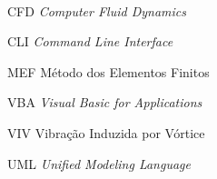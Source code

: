 

\imprimirfolhaderosto\

% 

% 









\listoffigures*
\cleardoublepage

\listoftables*
\cleardoublepage

\begin{siglas}
  \item[CFD] \textit{Computer Fluid Dynamics}
  \item[CLI] \textit{Command Line Interface}
  \item[MEF] Método dos Elementos Finitos
  \item[VBA] \textit{Visual Basic for Applications}
  \item[VIV] Vibração Induzida por Vórtice
  \item[UML] \textit{Unified Modeling Language}
\end{siglas}


\tableofcontents*
\cleardoublepage